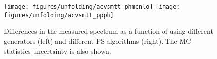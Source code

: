 \begin{figure}[!htb]\centering
  \texttt{[image: figures/unfolding/acvsmtt\_phmcnlo]}
  \texttt{[image: figures/unfolding/acvsmtt\_ppph]}
  \caption{Differences in the measured \ac{} spectrum as a function of
    \mtt{} using different generators (left) and different PS
    algorithms (right). The MC statistics uncertainty is also
    shown.}
  \label{fig:ttbarmodel}
\end{figure}
